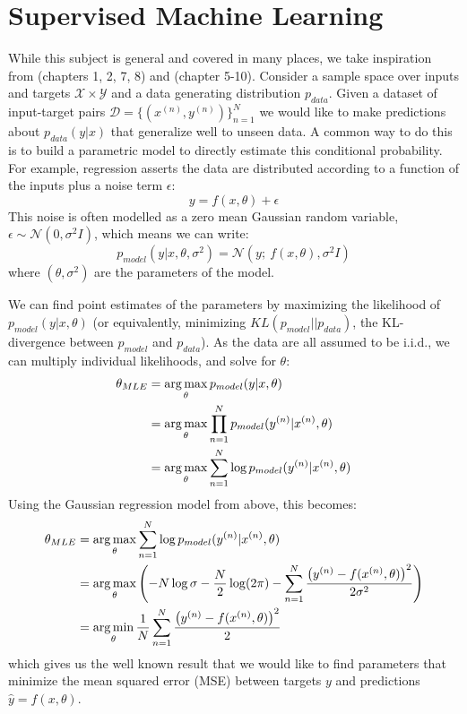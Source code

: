\section{Supervised Machine Learning}
While this subject is general and covered in many places, we take inspiration
from \cite{murphy_machine_2012} (chapters 1, 2, 7, 8) and
\cite{goodfellow_deep_2016} (chapter 5-10).
Consider a sample space over inputs and targets $\mathcal{X} \times \mathcal{Y}$
and a data generating distribution $p_{data}$. Given a dataset of input-target
pairs $\mathcal{D} = \{(x^{(n)}, y^{(n)})\}_{n=1}^N$ we would like to make
predictions about $p_{data}(y|x)$ that generalize well to unseen data. A common
way to do this is to build a parametric model to directly estimate this
conditional probability.  For example, regression asserts the data are
distributed according to a function of the inputs plus a noise term $\epsilon$:
\begin{equation}
  y = f(x, \theta) + \epsilon
\end{equation}
This noise is often modelled as a zero mean Gaussian random variable, $\epsilon
\sim \mathcal{N}(0, \sigma^2I)$, which means we can write:
\begin{equation}\label{eq:ch2:regression}
  p_{model}(y|x, \theta, \sigma^2) = \mathcal{N}(y;\ f(x, \theta), \sigma^2I)
\end{equation}
where $(\theta, \sigma^2)$ are the parameters of the model. 

We can find point estimates of the parameters by maximizing the likelihood of
$p_{model}(y|x, \theta)$ (or equivalently, minimizing $KL(p_{model}||p_{data})$, the KL-divergence between
$p_{model}$ and $p_{data}$). As the data are all assumed to be
i.i.d., we can multiply individual likelihoods, and solve for $\theta$:
\begin{align}
  \theta_{MLE} &= \operatorname*{arg\,max}_{\theta} p_{model}(y|x, \theta) \\
              &= \operatorname*{arg\,max}_{\theta} \prod_{n=1}^{N} p_{model}(y^{(n)}|x^{(n)}, \theta) \\
              &= \operatorname*{arg\,max}_{\theta} \sum_{n=1}^N \log p_{model}(y^{(n)}|x^{(n)}, \theta)
\end{align}
Using the Gaussian regression model from above, this becomes:
\begin{align} 
  \theta_{MLE} &= \operatorname*{arg\,max}_{\theta} \sum_{n=1}^N \log p_{model}(y^{(n)}|x^{(n)}, \theta) \\
              &= \operatorname*{arg\,max}_{\theta} \left(-N\log \sigma - \frac{N}{2}\log (2\pi) - \sum_{n=1}^{N}
                  \frac{\left(y^{(n)} - f(x^{(n)}, \theta)\right)^2}{2\sigma^2}\right) \\
                  &= \operatorname*{arg\,min}_{\theta}\frac{1}{N}\sum_{n=1}^{N} \frac{\left(y^{(n)} - f(x^{(n)}, \theta)\right)^2}{2} \label{eq:ch2:mle_reg}
\end{align}
which gives us the well known result that we would like to find parameters that
minimize the mean squared error (MSE) between targets $y$ and predictions
$\hat{y} = f(x, \theta)$.

